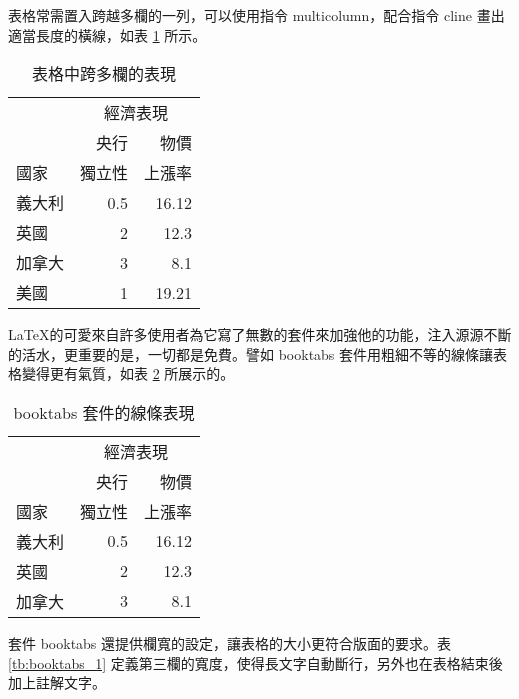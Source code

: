 表格常需置入跨越多欄的一列，可以使用指令 {\A multicolumn}，配合指令 {\A cline} 畫出適當長度的橫線，如表 \ref{tb:basic_multi_col}  所示。

\begin{table}[h]
    \centering
    \caption{表格中跨多欄的表現}\label{tb:basic_multi_col}
    \extrarowheight=4pt
    \begin{tabular}{lrr}
    \hline
         	& \multicolumn{2}{c}{經濟表現}\\\cline{2-3}%
            	& 央行  	& 物價 \\[-2pt]
    國家    	& 獨立性 	& 上漲率 	\\\hline\rowcolor{beige}
    義大利 	& 0.5   	& 16.12 	\\\rowcolor{bisque}
    英國    	& 2     	& 12.3 	\\\rowcolor{beige}
    加拿大 	& 3     	& 8.1 	\\\rowcolor{bisque}
    美國    & 1     	& 19.21 	\\\hline
    \end{tabular}
\end{table}

\LaTeX 的可愛來自許多使用者為它寫了無數的套件來加強他的功能，注入源源不斷的活水，更重要的是，一切都是免費。譬如 {\A booktabs} 套件用粗細不等的線條讓表格變得更有氣質，如表 \ref{tb:basic_multi_col_2} 所展示的。

\begin{table}[ht]
    \centering
    \caption{{\C booktabs} 套件的線條表現}\label{tb:basic_multi_col_2}
    \extrarowheight=6pt
    \begin{tabular}{lrr}
    \toprule
         	& \multicolumn{2}{c}{經濟表現}\\\cmidrule(l){2-3}
            	& 央行   	& 物價 \\[-2pt]
    國家    	& 獨立性   	& 上漲率 \\\midrule
    義大利	& 0.5       	& 16.12 \\
    英國    	& 2         	& 12.3 \\
    加拿大 	& 3         	& 8.1 \\
    \bottomrule
    \end{tabular}
\end{table}

套件 {\A booktabs} 還提供欄寬的設定，讓表格的大小更符合版面的要求。表 \ref{tb:booktabs_1} 定義第三欄的寬度，使得長文字自動斷行，另外也在表格結束後加上註解文字。

